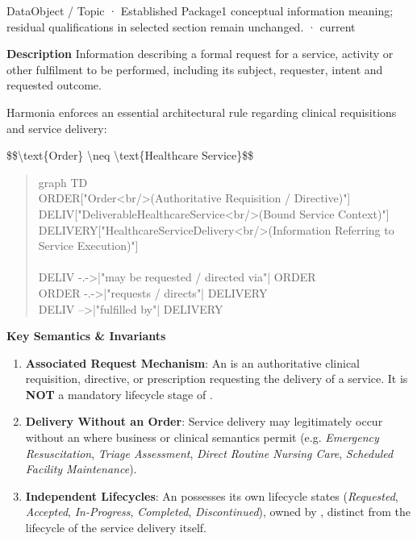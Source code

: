 \label{element:2a791e0e1f6b45c0a57fb8233f73faa5}
{\small DataObject / Topic · Established Package1 conceptual information meaning; residual qualifications in selected section remain unchanged. · current}\par

\textbf{Description}
Information describing a formal request for a service, activity or other fulfilment to be performed, including its subject, requester, intent and requested outcome.



Harmonia enforces an essential architectural rule regarding clinical requisitions and service delivery:



\$\$\textbackslash{}text\{Order\} \textbackslash{}neq \textbackslash{}text\{Healthcare Service\}\$\$



\begin{quote}\small\ttfamily
graph TD\\
    ORDER["Order<br/>(Authoritative Requisition / Directive)"]\\
    DELIV["DeliverableHealthcareService<br/>(Bound Service Context)"]\\
    DELIVERY["HealthcareServiceDelivery<br/>(Information Referring to Service Execution)"]\\
\\
    DELIV -.->|"may be requested / directed via"| ORDER\\
    ORDER -.->|"requests / directs"| DELIVERY\\
    DELIV -->|"fulfilled by"| DELIVERY\\

\end{quote}


\par\medskip\textbf{Key Semantics \& Invariants}\par


\begin{enumerate}


\item \textbf{Associated Request Mechanism}: An \texttt{} is an authoritative clinical requisition, directive, or prescription requesting the delivery of a service. It is \textbf{NOT} a mandatory lifecycle stage of \texttt{}.

\item \textbf{Delivery Without an Order}: Service delivery may legitimately occur without an \texttt{} where business or clinical semantics permit (e.g. \emph{Emergency Resuscitation}, \emph{Triage Assessment}, \emph{Direct Routine Nursing Care}, \emph{Scheduled Facility Maintenance}).

\item \textbf{Independent Lifecycles}: An \texttt{} possesses its own lifecycle states (\emph{Requested}, \emph{Accepted}, \emph{In-Progress}, \emph{Completed}, \emph{Discontinued}), owned by \texttt{}, distinct from the lifecycle of the service delivery itself.

\end{enumerate}


